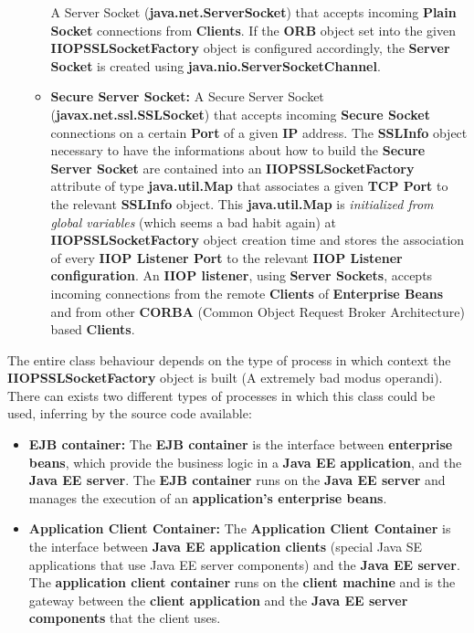 \begin{itemize}
\begin{itemize}
				A Server Socket (\textbf{java.net.ServerSocket}) that accepts incoming \textbf{Plain Socket} connections from \textbf{Clients}. If the \textbf{ORB} object set into the given \textbf{IIOPSSLSocketFactory} object is configured accordingly, the \textbf{Server Socket} is created using \textbf{java.nio.ServerSocketChannel}.
			\item \textbf{Secure Server Socket:}
				A Secure Server Socket (\textbf{javax.net.ssl.SSLSocket}) that accepts incoming \textbf{Secure Socket} connections on a certain \textbf{Port} of a given \textbf{IP} address.
				The \textbf{SSLInfo} object necessary to have the informations about how to build the \textbf{Secure Server Socket} are contained into an \textbf{IIOPSSLSocketFactory} attribute of type \textbf{java.util.Map} that associates a given \textbf{TCP Port} to the relevant \textbf{SSLInfo} object.
				This \textbf{java.util.Map} is \textit{initialized from global variables} (which seems a bad habit again) at \textbf{IIOPSSLSocketFactory} object creation time and stores the association of every \textbf{IIOP Listener Port} to the relevant \textbf{IIOP Listener configuration}.
				An \textbf{IIOP listener}, using \textbf{Server Sockets}, accepts incoming connections from the remote \textbf{Clients} of \textbf{Enterprise Beans} and from other \textbf{CORBA} (Common Object Request Broker Architecture) based \textbf{Clients}.
		\end{itemize}
\end{itemize}
The entire class behaviour depends on the type of process in which context the \textbf{IIOPSSLSocketFactory} object is built (A extremely bad modus operandi).
There can exists two different types of processes in which this class could be used, inferring by the source code available:
\begin{itemize}
	\item \textbf{EJB container:}
		The \textbf{EJB container} is the interface between \textbf{enterprise beans}, which provide the business logic in a \textbf{Java EE application}, and the \textbf{Java EE server}. The \textbf{EJB container} runs on the \textbf{Java EE server} and manages the execution of an \textbf{application's enterprise beans}.
	\item \textbf{Application Client Container:}
		The \textbf{Application Client Container} is the interface between \textbf{Java EE application clients} (special Java SE applications that use Java EE server components) and the \textbf{Java EE server}. The \textbf{application client container} runs on the \textbf{client machine} and is the gateway between the \textbf{client application} and the \textbf{Java EE server components} that the client uses.
\end{itemize}
